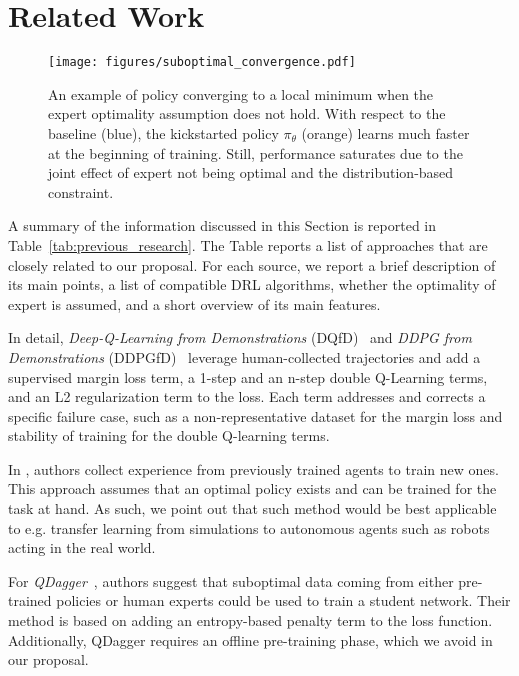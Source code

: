 \section{Related Work}
\begin{figure}
    \centering
    \texttt{[image: figures/suboptimal\_convergence.pdf]}
    \caption{An example of policy converging to a local minimum when the expert optimality assumption does not hold. With respect to the baseline (blue), the kickstarted policy $\pi_{\theta}$ (orange) learns much faster at the beginning of training. Still, performance saturates due to the joint effect of expert not being optimal and the distribution-based constraint.}
    \label{fig:local_minimum}
\end{figure}
A summary of the information discussed in this Section is reported in Table~\ref{tab:previous_research}. The Table reports a list of approaches that are closely related to our proposal. For each source, we report a brief description of its main points, a list of compatible DRL algorithms, whether the optimality of expert is assumed, and a short overview of its main features.

In detail, {\em Deep-Q-Learning from Demonstrations} (DQfD)~\cite{hester2017dqndemonstrations} and {\em DDPG from Demonstrations} (DDPGfD)~\cite{vecerik2018lddpgfd} leverage human-collected trajectories and add a supervised margin loss term, a 1-step and an n-step double Q-Learning terms, and an L2 regularization term to the loss. Each term addresses and corrects a specific failure case, such as a non-representative dataset for the margin loss and stability of training for the double Q-learning terms.

In \cite{schmitt2018kickstartrl}, authors collect experience from previously trained agents to train new ones. This approach assumes that an optimal policy exists and can be trained for the task at hand. As such, we point out that such method would be best applicable to e.g. transfer learning from simulations to autonomous agents such as robots acting in the real world. 

For {\em QDagger}~\cite{agarwal2022reincarnatingrl}, authors suggest that suboptimal data coming from either pre-trained policies or human experts could be used to train a student network. Their method is based on adding an entropy-based penalty term to the loss function. Additionally, QDagger requires an offline pre-training phase, which we avoid in our proposal.

